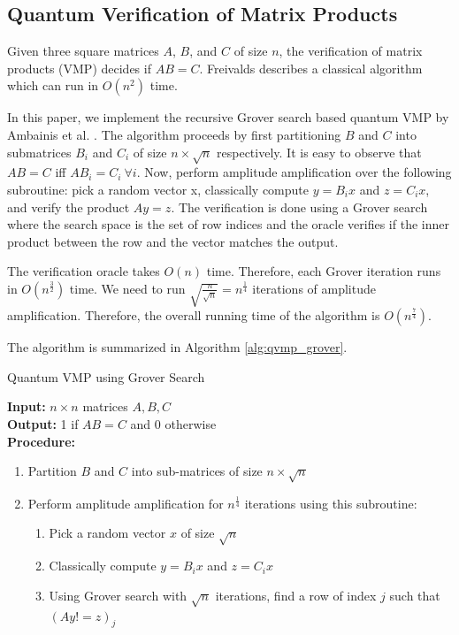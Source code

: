 \documentclass[10pt]{proc}
\theoremstyle{definition}
\theoremstyle{remark}
\begin{document}
\subsection{Quantum Verification of Matrix Products}

Given three square matrices $A$, $B$, and $C$ of size $n$, the verification of
matrix products (VMP) decides if $AB = C$. Freivalds describes a classical
algorithm which can run in $O(n^2)$ time.

In this paper, we implement the recursive Grover search based quantum VMP by
Ambainis et al. \cite{ambainis_quantum_2002}. The algorithm proceeds by first
partitioning $B$ and $C$ into submatrices $B_i$ and $C_i$ of size $n \times
\sqrt{n}$ respectively. It is easy to observe that $AB = C$ iff $AB_i = C_i \
\forall i$. Now, perform amplitude amplification over the following subroutine:
pick a random vector x, classically compute $y = B_ix$ and $z = C_ix$, and
verify the product $Ay = z$. The verification is done using a Grover search
where the search space is the set of row indices and the oracle verifies if the
inner product between the row and the vector matches the output.

The verification oracle takes $O(n)$ time. Therefore, each Grover iteration
runs in $O(n^{\frac{3}{2}})$ time. We need to run $\sqrt{\frac{n}{\sqrt{n}}} =
n^{\frac{1}{4}}$ iterations of amplitude amplification. Therefore, the overall
running time of the algorithm is $O(n^{\frac{7}{4}})$.

The algorithm is summarized in Algorithm \ref{alg:qvmp_grover}.

\begin{algorithm}
  \caption{Quantum VMP using Grover Search \cite{j_quantum_2020}}
  \label{alg:qvmp_grover}
  \textbf{Input: } $n \times n$ matrices $A, B, C$ \\
  \textbf{Output: } 1 if $AB = C$ and 0 otherwise \\
  \textbf{Procedure: }
  \begin{enumerate}
    \item Partition $B$ and $C$ into sub-matrices of size $n \times \sqrt{n}$
    \item 
      {
        Perform amplitude amplification for $n^{\frac{1}{4}}$ iterations using this subroutine:
        \begin{enumerate}
          \item Pick a random vector $x$ of size $\sqrt{n}$
          \item Classically compute $y = B_ix$ and $z = C_ix$
          \item Using Grover search with $\sqrt{n}$ iterations, find a row of
            index $j$ such that $(Ay != z)_j$
        \end{enumerate}
      }
  \end{enumerate}
\end{algorithm}
\end{document}
